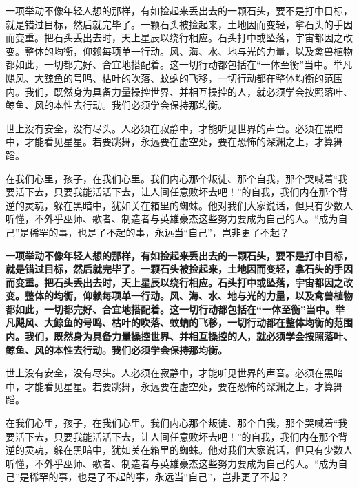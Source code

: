 {\heiti 一项举动不像年轻人想的那样，有如捡起来丢出去的一颗石头，要不是打中目标，就是错过目标，然后就完毕了。一颗石头被捡起来，土地因而变轻，拿石头的手因而变重。把石头丢出去时，天上星辰以绕行相应。石头打中或坠落，宇宙都因之改变。整体的均衡，仰赖每项单一行动。风、海、水、地与光的力量，以及禽兽植物都如此，一切都完好、合宜地搭配着。这一切行动都包括在“一体至衡”当中。举凡飓风、大鲸鱼的号鸣、枯叶的吹落、蚊蚋的飞移，一切行动都在整体均衡的范围内。我们，既然身为具备力量操控世界、并相互操控的人，就必须学会按照落叶、鲸鱼、风的本性去行动。我们必须学会保持那均衡。


世上没有安全，没有尽头。人必须在寂静中，才能听见世界的声音。必须在黑暗中，才能看见星星。若要跳舞，永远要在虚空处，要在恐怖的深渊之上，才算舞蹈。


在我们心里，孩子，在我们心里。我们内心那个叛徒、那个自我，那个哭喊着“我要活下去，只要我能活活下去，让人间任意败坏去吧！”的自我，我们内在那个背逆的灵魂，躲在黑暗中，犹如关在箱里的蜘蛛。他对我们大家说话，但只有少数人听懂，不外乎巫师、歌者、制造者与英雄豪杰这些努力要成为自己的人。“成为自己”是稀罕的事，也是了不起的事，永远当“自己”，岂非更了不起？}

{\heiti\bfseries 一项举动不像年轻人想的那样，有如捡起来丢出去的一颗石头，要不是打中目标，就是错过目标，然后就完毕了。一颗石头被捡起来，土地因而变轻，拿石头的手因而变重。把石头丢出去时，天上星辰以绕行相应。石头打中或坠落，宇宙都因之改变。整体的均衡，仰赖每项单一行动。风、海、水、地与光的力量，以及禽兽植物都如此，一切都完好、合宜地搭配着。这一切行动都包括在“一体至衡”当中。举凡飓风、大鲸鱼的号鸣、枯叶的吹落、蚊蚋的飞移，一切行动都在整体均衡的范围内。我们，既然身为具备力量操控世界、并相互操控的人，就必须学会按照落叶、鲸鱼、风的本性去行动。我们必须学会保持那均衡。


世上没有安全，没有尽头。人必须在寂静中，才能听见世界的声音。必须在黑暗中，才能看见星星。若要跳舞，永远要在虚空处，要在恐怖的深渊之上，才算舞蹈。


在我们心里，孩子，在我们心里。我们内心那个叛徒、那个自我，那个哭喊着“我要活下去，只要我能活活下去，让人间任意败坏去吧！”的自我，我们内在那个背逆的灵魂，躲在黑暗中，犹如关在箱里的蜘蛛。他对我们大家说话，但只有少数人听懂，不外乎巫师、歌者、制造者与英雄豪杰这些努力要成为自己的人。“成为自己”是稀罕的事，也是了不起的事，永远当“自己”，岂非更了不起？}